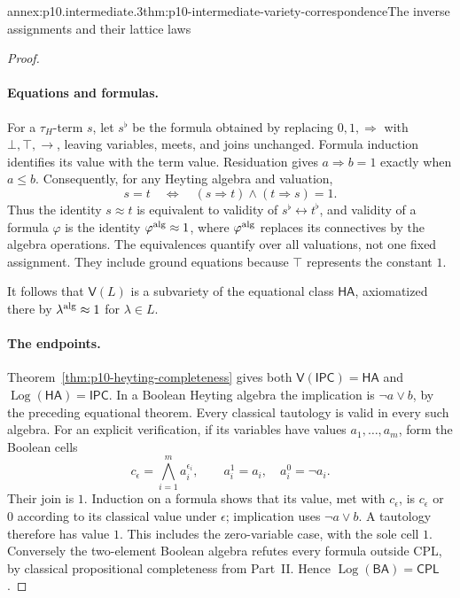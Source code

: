 \begin{annexitem}{annex:p10.intermediate.3}{thm:p10-intermediate-variety-correspondence}{The inverse assignments and their lattice laws}
\begin{proof}
\paragraph{Equations and formulas.}
For a \(\tau_H\)-term \(s\), let \(s^\flat\) be the formula obtained
by replacing \(0,1,\Rightarrow\) with \(\bot,\top,\to\), leaving
variables, meets, and joins unchanged.
Formula induction identifies its value with the term value.
Residuation gives
\(a\Rightarrow b=1\) exactly when \(a\leq b\).
Consequently, for any Heyting algebra and valuation,
\[
 s=t\quad\Longleftrightarrow\quad
 (s\Rightarrow t)\wedge(t\Rightarrow s)=1.
\]
Thus the identity \(s\approx t\) is equivalent to validity of
\(s^\flat\leftrightarrow t^\flat\), and validity of a formula
\(\varphi\) is the identity \(\varphi^{\rm alg}\approx1\), where
\(\varphi^{\rm alg}\) replaces its connectives by the algebra operations.
The equivalences quantify over all valuations, not one fixed assignment.
They include ground equations because \(\top\) represents the constant \(1\).

It follows that \(\mathsf V(L)\) is a subvariety of the equational
class \(\mathsf{HA}\), axiomatized there by
\(\lambda^{\rm alg}\approx1\) for \(\lambda\in L\).

\paragraph{The endpoints.}
Theorem~\ref{thm:p10-heyting-completeness} gives both
\(\mathsf V(\mathsf{IPC})=\mathsf{HA}\) and
\(\operatorname{Log}(\mathsf{HA})=\mathsf{IPC}\).
In a Boolean Heyting algebra the implication is \(\neg a\vee b\),
by the preceding equational theorem.
Every classical tautology is valid in every such algebra.
For an explicit verification, if its variables have values
\(a_1,\ldots,a_m\), form the Boolean cells
\[
 c_\epsilon=\bigwedge_{i=1}^m a_i^{\epsilon_i},
 \qquad a_i^1=a_i,\quad a_i^0=\neg a_i.
\]
Their join is \(1\).  Induction on a formula shows that its value,
met with \(c_\epsilon\), is \(c_\epsilon\) or \(0\) according to
its classical value under \(\epsilon\); implication uses
\(\neg a\vee b\).  A tautology therefore has value \(1\).
This includes the zero-variable case, with the sole cell \(1\).
Conversely the two-element Boolean algebra refutes every formula
outside CPL, by classical propositional completeness from Part~II.
Hence \(\operatorname{Log}(\mathsf{BA})=\mathsf{CPL}\).


\end{proof}
\end{annexitem}
